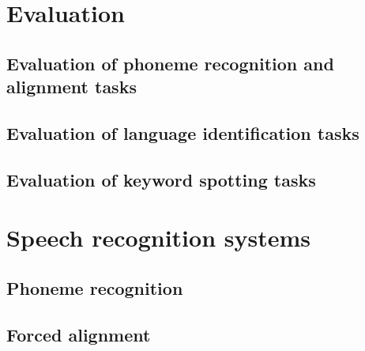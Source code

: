 \section{Evaluation}
\subsection{Evaluation of phoneme recognition and alignment tasks}
\subsection{Evaluation of language identification tasks}
\subsection{Evaluation of keyword spotting tasks}

\section{Speech recognition systems}
\subsection{Phoneme recognition}
\subsection{Forced alignment}
